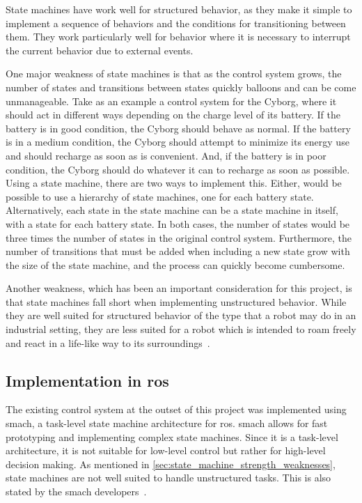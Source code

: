 \documentclass[\rootfolder/main.tex]{subfiles}
\begin{document}
State machines have work well for structured behavior, as they make it simple to implement a sequence of behaviors and the conditions for transitioning between them.
They work particularly well for behavior where it is necessary to interrupt the current behavior due to external events.

One major weakness of state machines is that as the control system grows, the number of states and transitions between states quickly balloons and can be come unmanageable.
Take as an example a control system for the Cyborg, where it should act in different ways depending on the charge level of its battery.
If the battery is in good condition, the Cyborg should behave as normal.
If the battery is in a medium condition, the Cyborg should attempt to minimize its energy use and should recharge as soon as is convenient.
And, if the battery is in poor condition, the Cyborg should do whatever it can to recharge as soon as possible.
Using a state machine, there are two ways to implement this.
Either, would be possible to use a hierarchy of state machines, one for each battery state.
Alternatively, each state in the state machine can be a state machine in itself, with a state for each battery state.
In both cases, the number of states would be three times the number of states in the original control system.
Furthermore, the number of transitions that must be added when including a new state grow with the size of the state machine, and the process can quickly become cumbersome.

Another weakness, which has been an important consideration for this project, is that state machines fall short when implementing unstructured behavior.
While they are well suited for structured behavior of the type that a robot may do in an industrial setting, they are less suited for a robot which is intended to roam freely and react in a life-like way to its surroundings~\cite{Millington2009}.


\subsection{Implementation in \acrshort{ros}}

The existing control system at the outset of this project was implemented using \acrshort{smach}, a task-level state machine architecture for \acrshort{ros}.
\acrshort{smach} allows for fast prototyping and implementing complex state machines.
Since it is a task-level architecture, it is not suitable for low-level control but rather for high-level decision making.
As mentioned in \cref{sec:state_machine_strength_weaknesses}, state machines are not well suited to handle unstructured tasks.
This is also stated by the \acrshort{smach} developers~\cite{Bohren}.
\end{document}

